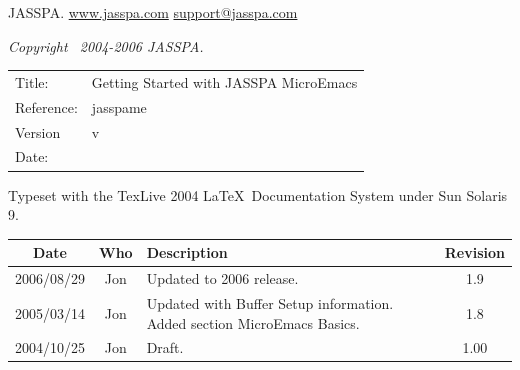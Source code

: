 \documentclass[11pt,a4paper,pdftex]{article}
\newcommand{\docTitle}{Getting Started with JASSPA MicroEmacs}
\newcommand{\docDate}{\CVSDate}
\newcommand{\docVersion}{\CVSRevision}
\newcommand{\docReference}{jasspame}
\newcommand{\tableTitle}[1]{\textbf{#1}}%
\begin{document}
\newpage
\setlength{\parindent}{0pt}
\setlength{\parskip}{0.5ex}
\pagestyle{fancy}

\begin{small}
\vspace{.5in}
JASSPA.
\href{http://www.jasspa.com}{www.jasspa.com}\newline
\href{mailto:support@jasspa.com}{support@jasspa.com}\newline

\vspace{0.5in}

\textit{Copyright \textcopyright\ 2004-2006 JASSPA.}


\vspace{0.5in}

\begin{table}[ht]
  \begin{tabular}{ll}
    Title:        & \docTitle \\
    Reference:    & \docReference \\
    Version       & v\docVersion \\
    Date:         & \docDate \\
  \end{tabular}
\end{table}

Typeset with the TexLive 2004 \LaTeX\ Documentation System under Sun Solaris
9.

\vspace{0.5in}

\begin{center}
  \begin{table}[ht]
    \begin{tabular}{|c|c|p{4in}|c|}
    \hline
    \tableTitle{Date} & \tableTitle{Who} & \tableTitle{Description} & \tableTitle{Revision} \\
    \hline
    2006/08/29 & Jon & Updated to 2006 release. & 1.9\\ \hline
    2005/03/14 & Jon & Updated with Buffer Setup information.
                       Added section MicroEmacs Basics. & 1.8\\ \hline
    2004/10/25 & Jon & Draft. & 1.00 \\ \hline
    \end{tabular}
  \end{table}
\end{center}
\end{small}
\end{document}
